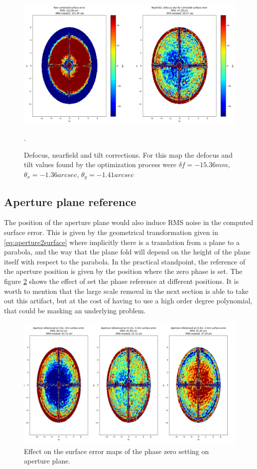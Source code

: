 \begin{figure}
    \centering
    \includegraphics[width=1\textwidth]{images/nearfield_correction.png}
    \caption{Defocus, nearfield and tilt corrections. For this map the defocus and tilt values found by the optimization process were $\delta f = -15.36mm$, $\theta_x=-1.36arcsec$, $\theta_y =-1.41arcsec$}.
    \label{fig:nearfield_correction}
\end{figure}




\subsection{Aperture plane reference}

The position of the aperture plane would also induce RMS noise in the computed surface error. This is given by the geometrical transformation given in \ref{eq:aperture2surface} where implicitly there is a translation from a plane to a parabola, and the way that the plane fold will depend on the height of the plane itself with respect to the parabola. In the practical standpoint, the reference of the aperture position is given by the position where the zero phase is set. 
The figure \ref{fig:phase_zero_ex} shows the effect of set the phase reference at different positions. 
It is worth to mention that the large scale removal in the next section is able to take out this artifact, but at the cost of having to use a high order degree polynomial, that could be masking an underlying problem.


\begin{figure}
    \centering
    \includegraphics[width=1\textwidth]{images/phase_zero_example.png}
    \caption{Effect on the surface error maps of the phase zero setting on aperture plane.}
    \label{fig:phase_zero_ex}
\end{figure}








